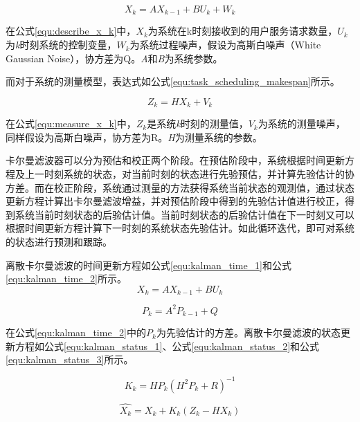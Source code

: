 \begin{equation}\label{equ:describe_x_k}
    X_k=AX_{k-1}+BU_{k}+W_{k}
\end{equation}

在公式\ref{equ:describe_x_k}中，$X_k$为系统在k时刻接收到的用户服务请求数量，$U_{k}$为\emph{k}时刻系统的控制变量，$W_k$为系统过程噪声，假设为高斯白噪声（White Gaussian Noise），协方差为Q。\emph{A}和\emph{B}为系统参数。

而对于系统的测量模型，表达式如公式\ref{equ:task_scheduling_makespan}所示。

\begin{equation}\label{equ:measure_x_k}
    Z_k=HX_{k}+V_{k}
\end{equation}

在公式\ref{equ:measure_x_k}中，$Z_k$是系统\emph{k}时刻的测量值，$V_k$为系统的测量噪声，同样假设为高斯白噪声，协方差为R。\emph{H}为测量系统的参数。

卡尔曼滤波器可以分为预估和校正两个阶段\cite{彭丁聪2009卡尔曼滤波的基本原理及应用}。在预估阶段中，系统根据时间更新方程及上一时刻系统的状态，对当前时刻的状态进行先验预估，并计算先验估计的协方差。而在校正阶段，系统通过测量的方法获得系统当前状态的观测值，通过状态更新方程计算出卡尔曼滤波增益，并对预估阶段中得到的先验估计值进行校正，得到系统当前时刻状态的后验估计值。当前时刻状态的后验估计值在下一时刻又可以根据时间更新方程计算下一时刻的系统状态先验估计。如此循环迭代，即可对系统的状态进行预测和跟踪。

离散卡尔曼滤波的时间更新方程如公式\ref{equ:kalman_time_1}和公式\ref{equ:kalman_time_2}所示。
\begin{equation}\label{equ:kalman_time_1}
    X_k=AX_{k-1}+BU_k
\end{equation}

\begin{equation}\label{equ:kalman_time_2}
    P_k=A^2P_{k-1}+Q
\end{equation}

在公式\ref{equ:kalman_time_2}中的$P_k$为先验估计的方差。离散卡尔曼滤波的状态更新方程如公式\ref{equ:kalman_status_1}、公式\ref{equ:kalman_status_2}和公式\ref{equ:kalman_status_3}所示。

\begin{equation}\label{equ:kalman_status_1}
    K_k=HP_k(H^2P_k+R)^{-1}
\end{equation}

\begin{equation}\label{equ:kalman_status_2}
    \widehat{X_k}=X_k+K_{k}(Z_k-HX_k)
\end{equation}

